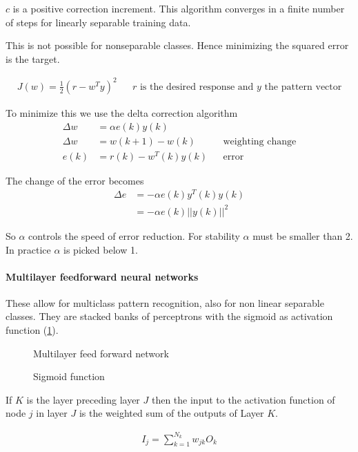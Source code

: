 $c$ is a positive correction increment.
This algorithm converges in a finite number of steps for linearly separable training data.

This is not possible for nonseparable classes.
Hence minimizing the squared error is the target.

\begin{align*}
J(w) = \frac{1}{2}(r-w^Ty)^2
&& r \text{ is the desired response and $y$ the pattern vector}
\end{align*}

To minimize this we use the delta correction algorithm
\begin{align*}
\Delta w &= \alpha e(k)y(k) \\
\Delta w &= w(k+1)-w(k) && \text{weighting change} \\
e(k) &= r(k) - w^T(k)y(k) && \text{error}
\end{align*}

The change of the error becomes
\begin{align*}
\Delta e &= -\alpha e(k) y^T(k) y(k) \\
 &= - \alpha e(k) ||y(k)||^2
\end{align*}

So $\alpha$ controls the speed of error reduction.
For stability $\alpha$ must be smaller than 2.
In practice $\alpha$ is picked below 1.

\paragraph{Multilayer feedforward neural networks}
These allow for multiclass pattern recognition, also for non linear separable classes.
They are stacked banks of perceptrons with the sigmoid as activation function (\ref{fig:sigmoid}).

\begin{figure}[htp]
\centering

\caption{Multilayer feed forward network}
\end{figure}

\begin{figure}[htp]
\centering

\caption{Sigmoid function}
\label{fig:sigmoid}
\end{figure}

If $K$ is the layer preceding layer $J$ then the input to the activation function of node $j$ in layer $J$ is the weighted sum of the outputs of Layer $K$.

\begin{align*}
I_j = \sum_{k=1}^{N_k}w_{jk}O_k
\end{align*}

